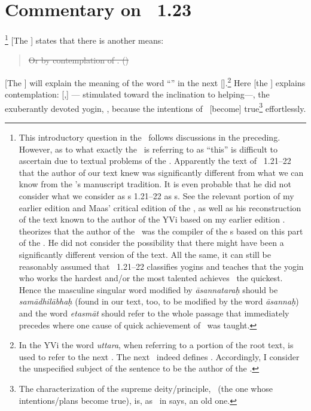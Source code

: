 \chapter{Commentary on \PYS\ 1.23}
\renewcommand{\rightmark}{\MakeUppercase{1.23]}}
\thispagestyle{plain}
\label{trl:on1.23}

\footnote{This introductory question in the \bhasya\ follows discussions in the preceding. However, as to what exactly the \bhasya\ is referring to as ``this'' is difficult to ascertain due to textual problems of the \PYS. Apparently the text of \PYS\ 1.21–22 that the author of our text knew was significantly different from what we can know from the \PYS's manuscript tradition. It is even probable that he did not consider what we consider as \sutra s 1.21--22 as \sutra s. See the relevant portion of my earlier edition \citep[230–1]{harimoto:diss} and Maas' critical edition of the \PYS, as well as his reconstruction of the text known to the author of the YVi based on my earlier edition \citep[32–33, 103, 141]{maas:2006}.  \citet{bronkhorst:patanjali+ys} theorizes that the author of the \bhasya\ was the compiler of the \sutra s based on this part of the \PYS. He did not consider the possibility that there might have been a significantly different version of the text. All the same, it can still be reasonably assumed that \PYS\ 1.21–22 classifies yogins and teaches that the yogin who works the hardest and/or the most talented achieves \samadhi\ the quickest. Hence the masculine singular word modified by \emph{āsannataraḥ} should be \emph{samādhilābhaḥ} (found in our text, too, to be modified by the word \emph{āsannaḥ}) and the word \emph{etasmāt} should refer to the whole passage that immediately precedes where one cause of quick achievement of \samadhi\ was taught.}  [The \Sutrakara] states that there is another means:

\begin{quotation}
\st{Or by contemplation of \Isvara. ()}
\end{quotation}

[The \Sutrakara] will explain the meaning of the word ``\Isvara'' in the next [\sutra].\footnote{In the YVi the word \emph{uttara}, when referring to a portion of the root text, is used to refer to the next \sutra.  The next \sutra\ indeed defines \Isvara.  Accordingly, I consider the unspecified subject of the sentence to be the author of the \sutra.}  Here [the \Bhasyakara]  explains contemplation: [\Isvara,] --- stimulated toward the inclination to helping---, the exuberantly devoted yogin, , because the intentions of \Paramesvara\ [become] true\footnote{The characterization of the supreme deity/principle, \satyasamkalpa\ (the one whose intentions/plans become true), is, as \Sankara\ in  says, an old one.} effortlessly. 

